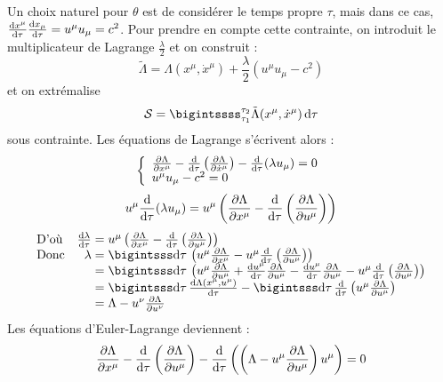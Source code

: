 {\txt Un choix naturel pour $\theta$ est de considérer le temps propre $\tau$, mais dans ce cas, $\frac{\mathrm{d} x^\mu}{\mathrm{d}\tau}\frac{\mathrm{d} x_\mu}{\mathrm{d}\tau}=u^\mu u_\mu=c^2$. Pour prendre en compte cette contrainte, on introduit le multiplicateur de Lagrange $\frac{\lambda}{2}$ et on construit :}
$$
	\tilde{\Lambda}=\Lambda(x^\mu,\dot{x}^\mu)+\frac{\lambda}{2}(u^\mu u_\mu-c^2)
$$
et on extrémalise 
$$
	\mathcal{S}=\bigintssss_{\tau_1}^{\tau_2} \tilde{\Lambda}(x^\mu,\dot{x}^\mu)\,\dif\tau
$$
sous contrainte. Les équations de Lagrange s'écrivent alors :
$$
	\left\{ \begin{array}{l}
		\frac{\partial\Lambda}{\partial x^\mu}-\frac{\mathrm{d}}{\mathrm{d}\tau}\left(\frac{\partial \Lambda}{\partial\dot{x}^\mu}\right)-\frac{\mathrm{d}}{\mathrm{d}\tau}(\lambda u_\mu)=0	\\
		u^\mu u_\mu-c^2=0
	\end{array} \right.
$$
$$
	u^\mu \frac{\mathrm{d}}{\mathrm{d}\tau}(\lambda u_\mu)=u^\mu\left(\frac{\partial\Lambda}{\partial x^\mu}-\frac{\mathrm{d}}{\mathrm{d}\tau}\left(\frac{\partial \Lambda}{\partial u^\mu}\right)\right)
$$
$$
	\begin{array}{lr@{\;}l}
		\text{D'où}&\frac{\dif \lambda}{\dif\tau}&=u^\mu\left(\frac{\partial\Lambda}{\partial x^\mu}-\frac{\dif}{\dif\tau}\left(\frac{\partial \Lambda}{\partial u^\mu}\right)\right)\\
		\text{Donc}&\lambda &=\bigintsss\dif\tau\,\left( u^\mu \frac{\partial\Lambda}{\partial x^\mu}-u^\mu \frac{\dif}{\dif\tau}\left(\frac{\partial \Lambda}{\partial u^\mu}\right)\right)\\
		&&=\bigintsss\dif\tau\,\left(u^\mu \frac{\partial \Lambda}{\partial u^\mu}+ \frac{\dif u^\mu}{\dif\tau}\frac{\partial\Lambda}{\partial u^\mu}-\frac{\dif u^\mu}{\dif\tau}\frac{\partial\Lambda}{\partial u^\mu}-u^\mu \frac{\dif}{\dif\tau}\left(\frac{\partial \Lambda}{\partial u^\mu}\right) \right)\\
		&&=\bigintsss\dif\tau\,\frac{\dif\Lambda(x^\mu ,u^\mu)}{\dif\tau} - \bigintsss\dif\tau\,\frac{\dif}{\dif\tau}\left(u^\mu\frac{\partial \Lambda}{\partial u^\mu} \right) \\
		&&=\Lambda-u^\nu\frac{\partial \Lambda}{\partial u^\nu}
	\end{array}
$$
Les équations d'Euler-Lagrange deviennent :
$$
	\frac{\partial\Lambda}{\partial x^\mu}-\frac{\mathrm{d}}{\mathrm{d}\tau}\left(\frac{\partial \Lambda}{\partial u^\mu}\right)-\frac{\mathrm{d}}{\mathrm{d}\tau}\left(\left(\Lambda-u^\mu\frac{\partial\Lambda}{\partial u^\mu}\right) u^\mu\right)=0
$$

